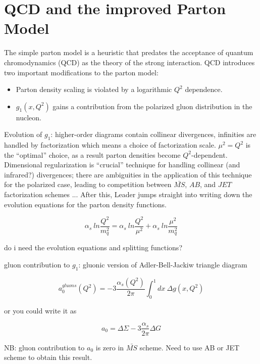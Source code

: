 \section{QCD and the improved Parton Model}

The simple parton model is a heuristic that predates the acceptance of quantum chromodynamics (QCD) as the theory of the strong interaction.  QCD introduces two important modifications to the parton model:
%
\begin{itemize}
  \item Parton density scaling is violated by a logarithmic $Q^2$ dependence.
  \item $g_1(x,Q^2)$ gains a contribution from the polarized gluon distribution in the nucleon.
\end{itemize}
%

Evolution of $g_1$: higher-order diagrams contain collinear divergences, infinities are handled by factorization which means a choice of factorization scale.  $\mu^2 = Q^2$ is the ``optimal'' choice, as a result parton densities become $Q^2$-dependent.  Dimensional regularization is ``crucial'' technique for handling collinear (and infrared?) divergences; there are ambiguities in the application of this technique for the polarized case, leading to competition between $\bar{MS}$, $AB$, and $JET$ factorization schemes ... After this, Leader jumps straight into writing down the evolution equations for the parton density functions.

\begin{equation}
  \alpha_s~ln \frac{Q^2}{m_q^2} = \alpha_s~ln \frac{Q^2}{\mu^2} + \alpha_s~ln \frac{\mu^2}{m_q^2}
\end{equation}

do i need the evolution equations and splitting functions?

gluon contribution to $g_1$:  gluonic version of Adler-Bell-Jackiw triangle diagram 

\begin{equation}
  a_0^{gluons}(Q^2) = -3 \frac{\alpha_s(Q^2)}{2\pi} \int_0^1 dx~\Delta g(x, Q^2)
\end{equation}

or you could write it as

\begin{equation}
  a_0 = \Delta \Sigma - 3 \frac{\alpha_s}{2\pi}\Delta G
\end{equation}

NB: gluon contribution to $a_0$ is zero in $\bar{MS}$ scheme.  Need to use AB or JET scheme to obtain this result.

